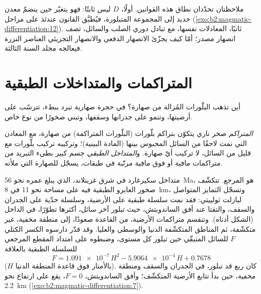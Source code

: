 ملاحظتان تحدّدان نطاق هذه القوانين. أولًا، $D$ ليس ثابتًا: فهو يتغيّر
حين ينضمّ معدن جديد إلى المجموعة المتبلورة، فيُطبَّق القانون عندئذ
على مراحل (\cref{exo:b2:magmatic-differentiation:12}). ثانيًا، المعادلات نفسها، مع تبادل دوري الصلب
والسائل، تصف انصهار مصدر؛ أمّا كيف يجزّئ الانصهار الدفعي والانصهار
التجزيئي العناصر النزرة فيعالجه مجلد السنة الثالثة.

\section{المتراكمات والمتداخلات الطبقية}\label{sec:b2:magmatic-differentiation:cumulates}

أين تذهب البلّورات المُزالة من صهارة؟ في حجرة صهارية تبرد
ببطء، تترسّب على أرضيتها، وتنمو على جدرانها وسقفها، وتبني صخورًا من
نوع خاص.

\begin{definition}\label{def:b2:magmatic-differentiation:cumulate}
\emph{المتراكم} صخر ناري يتكوّن بتراكم
بلّورات (البلّورات المتراكمة) من صهارة، مع المعادن التي نمت لاحقًا
من السائل المحبوس بينها (المادة البينية)؛ وتركيبه
تركيب بلّورات مع قليل من السائل، لا تركيب أيّ صهارة. و\emph{المتداخل
الطبقي} جسم كبير بطيء التبريد من متراكمات مافية أو
فوق مافية مرتّبة في طبقات، يسجّل 
للصهارة التي ملأته.
\end{definition}

متداخل سكيرغارد في شرق غرينلاند، الذي يبلغ عمره نحو \qty{56}{Ma}، هو
المرجع. تتكشّف صخور الغابرو الطبقية فيه على مساحة نحو 11 في \qty{8}{km}، وتسجّل
التمايز المتواصل لبازلت ثولييتي: فقد نمت سلسلة طبقية على
الأرضية، وسلسلة حدّية على الجدران والسقف، والتقتا عند أفق الساندويتش،
حيث تبلور آخر سائل، أكثرها تطوّرًا، في الداخل (الشكل أدناه).
وتنقسم متراكمات الأرضية، من القاعدة صعودًا، إلى منطقة مخفية، غير متكشّفة،
ثم المناطق المتكشّفة الدنيا والوسطى والعليا. وقد
قدّر دارسوه الكسر الكتلي $F$ للسائل المتبقّي حين تبلور كل مستوى، وضبطوه
على امتداد المقطع المرجعي للسلسلة الطبقية بالعلاقة
\[
F = \num{1.091e-7}\,H^2 - \num{5.9064e-4}\,H + 0.7678
\]
($H$ بالأمتار فوق قاعدة المنطقة الدنيا). كان ربع  قد
تبلور، في الجدران والسقف ومنطقة مخفية، حين بدأ تتابع الأرضية
المتكشّف؛ وأفق الساندويتش، $F = 0$، يقع على ارتفاع نحو \qty{2.2}{km}
(\cref{exo:b2:magmatic-differentiation:7}).

